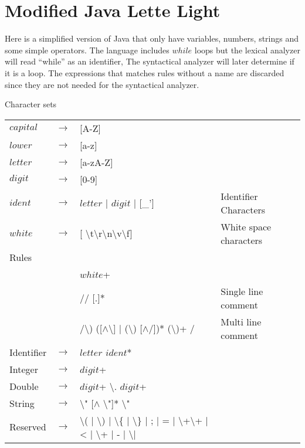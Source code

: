\chapter{Modified Java Lette Light}\label{reglang}
Here is a simplified version of Java that only have variables, numbers, strings and some
simple operators. The language includes $while$ loops but the lexical analyzer
will read ``while'' as an identifier, The syntactical analyzer will later
determine if it is a loop. The expressions that matches rules without a name
are discarded since they are not needed for the syntactical analyzer.

Character sets\\
\begin{tabular}{l c l l}
$capital$ & $\rightarrow$ & [A-Z]\\
$lower$   & $\rightarrow$ & [a-z]\\
$letter$  & $\rightarrow$ & [a-zA-Z]\\
$digit$   & $\rightarrow$ & [0-9]\\
$ident$   & $\rightarrow$ & $letter$ | $digit$ | [\_'] & Identifier Characters\\
$white$   & $\rightarrow$ & [ \textbackslash{t}\textbackslash{r}\textbackslash{n}\textbackslash{v}\textbackslash{f}] & White space characters\\
Rules\\
& & $white$+\\
& & // [.]* & Single line comment\\
& & /\textbackslash*) ([$\wedge$\textbackslash*] | (\textbackslash*) [$\wedge$/])*
    (\textbackslash*)+ / & Multi line comment\\
Identifier & $\rightarrow$ & $letter$ $ident$*\\
Integer    & $\rightarrow$ & $digit$+\\
Double     & $\rightarrow$ & $digit$+ \textbackslash. $digit$+\\
String     & $\rightarrow$ & \textbackslash" [$\wedge$ \textbackslash"]* \textbackslash"\\
Reserved   & $\rightarrow$ & \textbackslash( | \textbackslash) | \textbackslash\{
                         | \textbackslash\} | ; | = | \textbackslash+\textbackslash+
                         | < | \textbackslash+ | - | \textbackslash* | \/ \\ %
\end{tabular}
